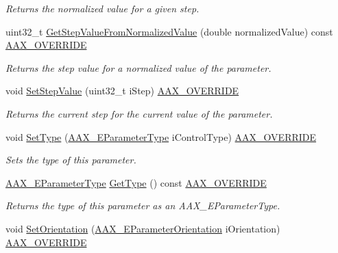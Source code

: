 \begin{Indent}
\begin{DoxyCompactItemize}
\begin{DoxyCompactList}\small\item\em Returns the normalized value for a given step. \end{DoxyCompactList}\item 
uint32\+\_\+t \mbox{\hyperlink{a01537_ab6b9451a0dee2caa12829b1e7fca856b}{Get\+Step\+Value\+From\+Normalized\+Value}} (double normalized\+Value) const \mbox{\hyperlink{a00392_ac2f24a5172689ae684344abdcce55463}{A\+A\+X\+\_\+\+O\+V\+E\+R\+R\+I\+DE}}
\begin{DoxyCompactList}\small\item\em Returns the step value for a normalized value of the parameter. \end{DoxyCompactList}\item 
void \mbox{\hyperlink{a01537_a832da5dbb22198976ca7f060b13a6406}{Set\+Step\+Value}} (uint32\+\_\+t i\+Step) \mbox{\hyperlink{a00392_ac2f24a5172689ae684344abdcce55463}{A\+A\+X\+\_\+\+O\+V\+E\+R\+R\+I\+DE}}
\begin{DoxyCompactList}\small\item\em Returns the current step for the current value of the parameter. \end{DoxyCompactList}\item 
void \mbox{\hyperlink{a01537_a9e02554bfbcc0b7d2598c57d1e2f186c}{Set\+Type}} (\mbox{\hyperlink{a00491_a4cd0f189daa9a60cf36883c56344bb2e}{A\+A\+X\+\_\+\+E\+Parameter\+Type}} i\+Control\+Type) \mbox{\hyperlink{a00392_ac2f24a5172689ae684344abdcce55463}{A\+A\+X\+\_\+\+O\+V\+E\+R\+R\+I\+DE}}
\begin{DoxyCompactList}\small\item\em Sets the type of this parameter. \end{DoxyCompactList}\item 
\mbox{\hyperlink{a00491_a4cd0f189daa9a60cf36883c56344bb2e}{A\+A\+X\+\_\+\+E\+Parameter\+Type}} \mbox{\hyperlink{a01537_a0a7163ae07746260e3f6be4a6c974e4c}{Get\+Type}} () const \mbox{\hyperlink{a00392_ac2f24a5172689ae684344abdcce55463}{A\+A\+X\+\_\+\+O\+V\+E\+R\+R\+I\+DE}}
\begin{DoxyCompactList}\small\item\em Returns the type of this parameter as an A\+A\+X\+\_\+\+E\+Parameter\+Type. \end{DoxyCompactList}\item 
void \mbox{\hyperlink{a01537_a99f0a049099f10a0b2e71329a3d75e9a}{Set\+Orientation}} (\mbox{\hyperlink{a00491_a52f91d1c14aa5dceedabfb9d2de31bf0}{A\+A\+X\+\_\+\+E\+Parameter\+Orientation}} i\+Orientation) \mbox{\hyperlink{a00392_ac2f24a5172689ae684344abdcce55463}{A\+A\+X\+\_\+\+O\+V\+E\+R\+R\+I\+DE}}

\end{DoxyCompactItemize}
\end{Indent}
